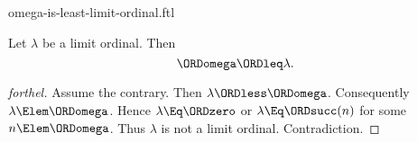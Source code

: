 \documentclass{stex}
\begin{document}
\begin{smodule}{omega-is-least-limit-ordinal.ftl}

\begin{proposition}[forthel,id=SET_THEORY_03_5517271459954688]
  Let $\lambda$ be a limit ordinal.
  Then \[ \ORDomega \ORDleq \lambda. \]
\end{proposition}
\begin{proof}[forthel]
  Assume the contrary.
  Then $\lambda \ORDless \ORDomega$.
  Consequently $\lambda \Elem \ORDomega$.
  Hence $\lambda \Eq \ORDzero$ or $\lambda \Eq \ORDsucc(n)$ for some $n \Elem \ORDomega$.
  Thus $\lambda$ is not a limit ordinal.
  Contradiction.
\end{proof}
\end{smodule}
\end{document}
